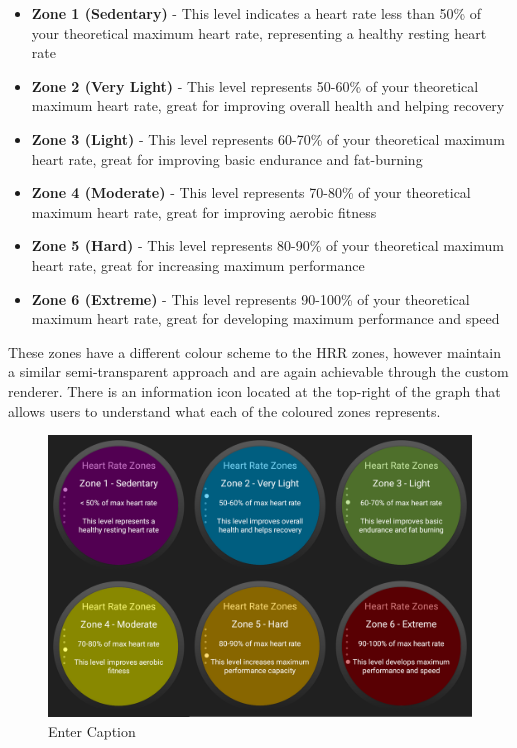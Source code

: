 \documentclass{l4proj}
\begin{document}
\begin{itemize}
    \item \textbf{Zone 1 (Sedentary)} - This level indicates a heart rate less than 50\% of your theoretical maximum heart rate, representing a healthy resting heart rate
    \item \textbf{Zone 2 (Very Light)} - This level represents 50-60\% of your theoretical maximum heart rate, great for improving overall health and helping recovery
    \item \textbf{Zone 3 (Light)} - This level represents 60-70\% of your theoretical maximum heart rate, great for improving basic endurance and fat-burning
    \item \textbf{Zone 4 (Moderate)} - This level represents 70-80\% of your theoretical maximum heart rate, great for improving aerobic fitness
    \item \textbf{Zone 5 (Hard)} - This level represents 80-90\% of your theoretical maximum heart rate, great for increasing maximum performance
    \item \textbf{Zone 6 (Extreme)} - This level represents 90-100\% of your theoretical maximum heart rate, great for developing maximum performance and speed
\end{itemize}

These zones have a different colour scheme to the HRR zones, however maintain a similar semi-transparent approach and are again achievable through the custom renderer. There is an information icon located at the top-right of the graph that allows users to understand what each of the coloured zones represents.

\begin{figure}[h!]
    \centering
    \includegraphics[width=0.75\linewidth]{dissertation//dissImages/HRZonesCombined.png}
    \caption{Enter Caption}
    \label{fig:enter-label}
\end{figure}
\end{document}
